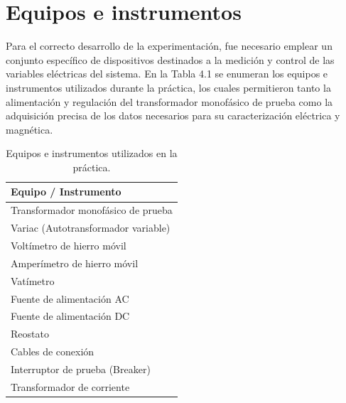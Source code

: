 \section{Equipos e instrumentos}

Para el correcto desarrollo de la experimentación, fue necesario emplear un conjunto específico de dispositivos destinados a la medición y control de las variables eléctricas del sistema. En la Tabla 4.1 se enumeran los equipos e instrumentos utilizados durante la práctica, los cuales permitieron tanto la alimentación y regulación del transformador monofásico de prueba como la adquisición precisa de los datos necesarios para su caracterización eléctrica y magnética.

\begin{table}[h]
\centering
\caption{Equipos e instrumentos utilizados en la práctica.}
\renewcommand{\arraystretch}{1.2}
\begin{tabular}{l}
\toprule
\textbf{Equipo / Instrumento} \\ 
\midrule
Transformador monofásico de prueba \\
Variac (Autotransformador variable) \\
Voltímetro de hierro móvil \\
Amperímetro de hierro móvil \\
Vatímetro \\
Fuente de alimentación AC \\
Fuente de alimentación DC \\
Reostato \\
Cables de conexión \\
Interruptor de prueba (Breaker) \\
Transformador de corriente \\
\bottomrule
\end{tabular}
\end{table}

